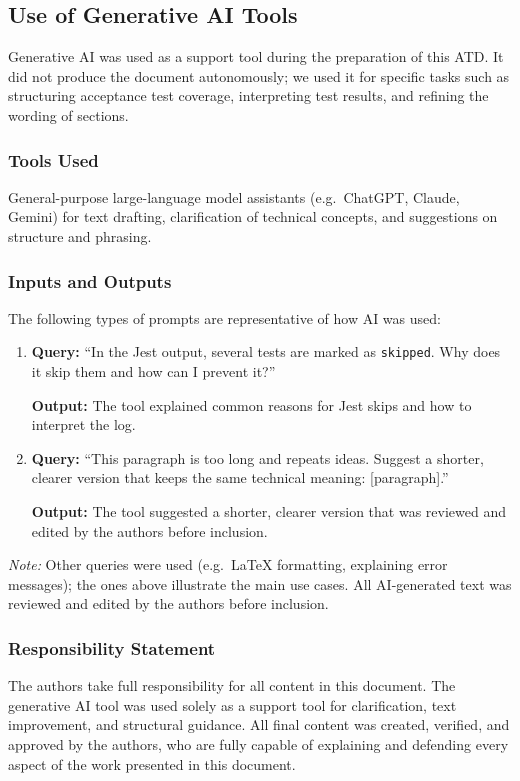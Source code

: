 \subsection{Use of Generative AI Tools}
\label{subsec:ai_tools}%

Generative AI was used as a support tool during the preparation of this ATD. It did not produce the document autonomously; we used it for specific tasks such as structuring acceptance test coverage, interpreting test results, and refining the wording of sections.

\subsubsection*{Tools Used}

General-purpose large-language model assistants (e.g.\ ChatGPT, Claude, Gemini) for text drafting, clarification of technical concepts, and suggestions on structure and phrasing.

\subsubsection*{Inputs and Outputs}

The following types of prompts are representative of how AI was used:

\begin{enumerate}
    \item \textbf{Query:} ``In the Jest output, several tests are marked as \texttt{skipped}. Why does it skip them and how can I prevent it?''
    
    \textbf{Output:} The tool explained common reasons for Jest skips and how to interpret the log.
    
    \item \textbf{Query:} ``This paragraph is too long and repeats ideas. Suggest a shorter, clearer version that keeps the same technical meaning: [paragraph].''
    
    \textbf{Output:} The tool suggested a shorter, clearer version that was reviewed and edited by the authors before inclusion.
\end{enumerate}

\vspace{0.3cm}
\textit{Note:} Other queries were used (e.g.\ LaTeX formatting, explaining error messages); the ones above illustrate the main use cases. All AI-generated text was reviewed and edited by the authors before inclusion.

\subsubsection*{Responsibility Statement}

The authors take full responsibility for all content in this document. The generative AI tool was used solely as a support tool for clarification, text improvement, and structural guidance. All final content was created, verified, and approved by the authors, who are fully capable of explaining and defending every aspect of the work presented in this document.
